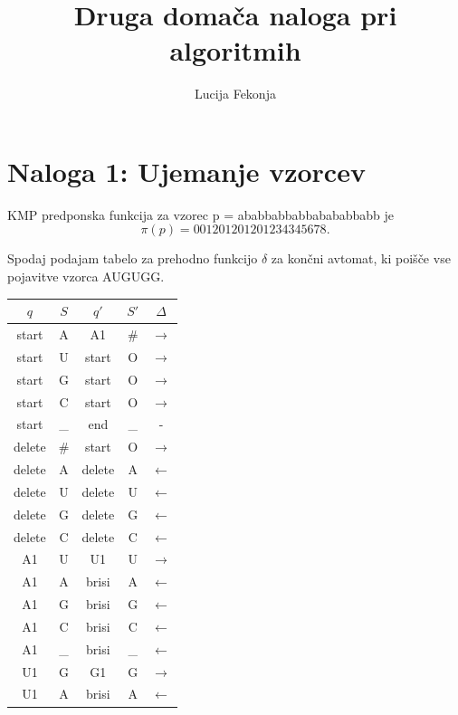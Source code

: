 \documentclass{article}
\title{Druga domača naloga pri algoritmih}
\author{Lucija Fekonja}
\begin{document}
\maketitle

\section*{Naloga 1: Ujemanje vzorcev}
KMP predponska funkcija za vzorec {\selectfont p = ababbabbabbabababbabb} je
$$ \pi (p) = 001201201201234345678 \text{.}$$

Spodaj podajam tabelo za prehodno funkcijo $\delta$ za končni avtomat, ki poišče vse pojavitve vzorca {\selectfont AUGUGG}.

\begin{center}
    \begin{tabular}{| c | c || c | c | c |}
        \hline
        $q$ & $S$ & $q'$ & $S'$ & $\Delta$   \\  \hline
        start & A & A1 & \# & $\rightarrow$  \\ \hline
        start & U & start & O & $\rightarrow$  \\ \hline
        start & G & start & O & $\rightarrow$  \\ \hline
        start & C & start & O & $\rightarrow$  \\ \hline
        start & \_ & end & \_ & -  \\ \hline
        delete & \# & start & O & $\rightarrow$  \\ \hline
        delete & A & delete & A & $\leftarrow$  \\ \hline
        delete & U & delete & U & $\leftarrow$  \\ \hline
        delete & G & delete & G & $\leftarrow$  \\ \hline
        delete & C & delete & C & $\leftarrow$  \\ \hline
        A1 & U & U1 & U & $\rightarrow$  \\ \hline
        A1 & A & brisi & A & $\leftarrow$  \\ \hline
        A1 & G & brisi & G & $\leftarrow$  \\ \hline
        A1 & C & brisi & C & $\leftarrow$  \\ \hline
        A1 & \_ & brisi & \_ & $\leftarrow$  \\ \hline
        U1 & G & G1 & G & $\rightarrow$  \\ \hline
        U1 & A & brisi & A & $\leftarrow$  \\ \hline

\end{tabular}
\end{center}
\end{document}
